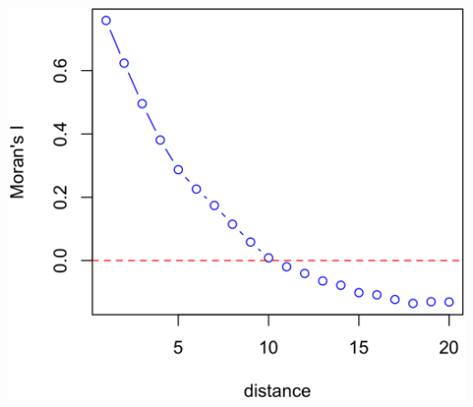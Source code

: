 \documentclass[10pt, compress]{beamer}
\begin{document}
\begin{frame}[fragile]
\begin{columns}
{     \includegraphics[width=1.05\textwidth]{images/spcorr.png}
     }
  \end{columns}
\end{frame}

\end{document}
